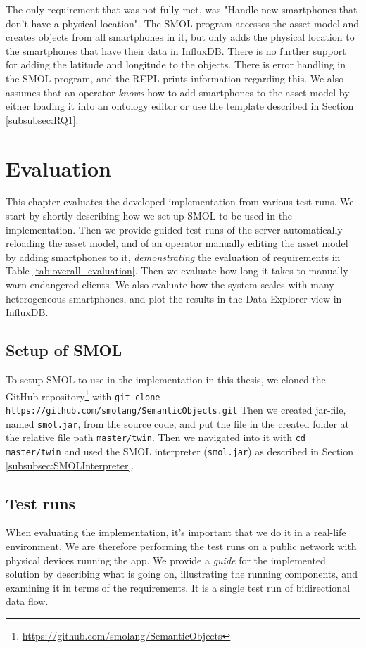 \documentclass{article}
\begin{document}
The only requirement that was not fully met, was "Handle new smartphones that don’t have a physical location". The SMOL program accesses the asset model and creates objects from all smartphones in it, but only adds the physical location to the smartphones that have their data in InfluxDB. There is no further support for adding the latitude and longitude to the objects. There is error handling in the SMOL program, and the REPL prints information regarding this. We also assumes that an operator \emph{knows} how to add smartphones to the asset model by either loading it into an ontology editor or use the template described in Section \ref{subsubsec:RQ1}.
\newpage


\section{Evaluation}\label{sec:Evaluation}
 This chapter evaluates the developed implementation from various test runs. We start by shortly describing how we set up SMOL to be used in the implementation. Then we provide guided test runs of the server automatically reloading the asset model, and of an operator manually editing the asset model by adding smartphones to it, \emph{demonstrating} the evaluation of requirements in Table \ref{tab:overall_evaluation}. Then we evaluate how long it takes to manually warn endangered clients. We also evaluate how the system scales with many heterogeneous smartphones, and plot the results in the Data Explorer view in InfluxDB.

\subsection{Setup of SMOL}\label{subsec:Setup}
To setup SMOL to use in the implementation in this thesis, we cloned the GitHub repository\footnote{\url{https://github.com/smolang/SemanticObjects}} with
\newline 
\verb|git clone https://github.com/smolang/SemanticObjects.git|
\newline
Then we created jar-file, named \verb|smol.jar|, from the source code, and put the file in the created folder at the relative file path \verb|master/twin|. Then we navigated into it with \verb|cd master/twin| and used the SMOL interpreter (\verb|smol.jar|) as described in Section \ref{subsubsec:SMOLInterpreter}.

\subsection{Test runs}\label{subsec:test_runs}
When evaluating the implementation, it's important that we do it in a real-life environment. We are therefore performing the test runs on a public network with physical devices running the app. We provide a \emph{guide} for the implemented solution by describing what is going on, illustrating the running components, and examining it in terms of the requirements. It is a single test run of bidirectional data flow.
\end{document}
